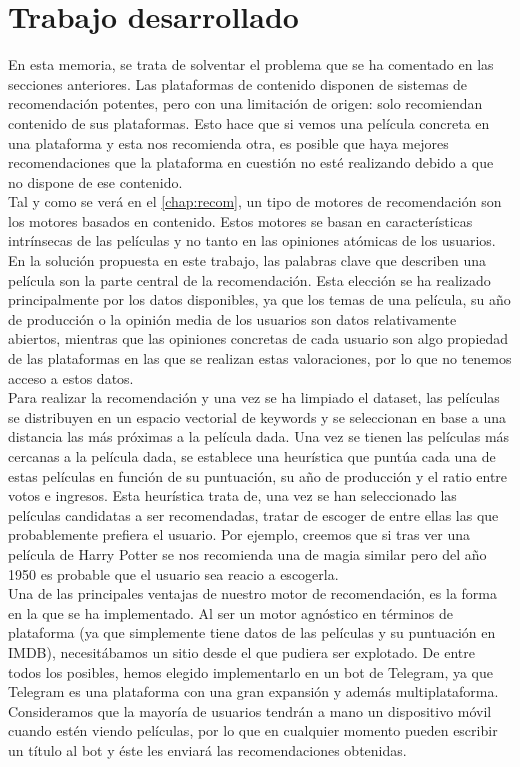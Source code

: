 \section{Trabajo desarrollado}\label{sec:trabajodesarrollado}

En esta memoria, se trata de solventar el problema que se ha comentado en las secciones anteriores. Las plataformas de contenido disponen de sistemas de recomendación potentes, pero con una limitación de origen: solo recomiendan contenido de sus plataformas. Esto hace que si vemos una película concreta en una plataforma y esta nos recomienda otra, es posible que haya mejores recomendaciones que la plataforma en cuestión no esté realizando debido a que no dispone de ese contenido.\\ 

Tal y como se verá en el \autoref{chap:recom}, un tipo de motores de recomendación son los motores basados en contenido. Estos motores se basan en características intrínsecas de las películas y no tanto en las opiniones atómicas de los usuarios. En la solución propuesta en este trabajo, las palabras clave que describen una película son la parte central de la recomendación. Esta elección se ha realizado principalmente por los datos disponibles, ya que los temas de una película, su año de producción o la opinión media de los usuarios son datos relativamente abiertos, mientras que las opiniones concretas de cada usuario son algo propiedad de las plataformas en las que se realizan estas valoraciones, por lo que no tenemos acceso a estos datos.\\ 

Para realizar la recomendación y una vez se ha limpiado el dataset, las películas se distribuyen en un espacio vectorial de keywords y se seleccionan en base a una distancia las más próximas a la película dada. Una vez se tienen las películas más cercanas a la película dada, se establece una heurística que puntúa cada una de estas películas en función de su puntuación, su año de producción y el ratio entre votos e ingresos. Esta heurística trata de, una vez se han seleccionado las películas candidatas a ser recomendadas, tratar de escoger de entre ellas las que probablemente prefiera el usuario. Por ejemplo, creemos que si tras ver una película de Harry Potter se nos recomienda una de magia similar pero del año 1950 es probable que el usuario sea reacio a escogerla.\\

Una de las principales ventajas de nuestro motor de recomendación, es la forma en la que se ha implementado. Al ser un motor agnóstico en términos de plataforma (ya que simplemente tiene datos de las películas y su puntuación en IMDB), necesitábamos un sitio desde el que pudiera ser explotado. De entre todos los posibles, hemos elegido implementarlo en un bot de Telegram, ya que Telegram es una plataforma con una gran expansión y además multiplataforma. Consideramos que la mayoría de usuarios tendrán a mano un dispositivo móvil cuando estén viendo películas, por lo que en cualquier momento pueden escribir un título al bot y éste les enviará las recomendaciones obtenidas.\\

